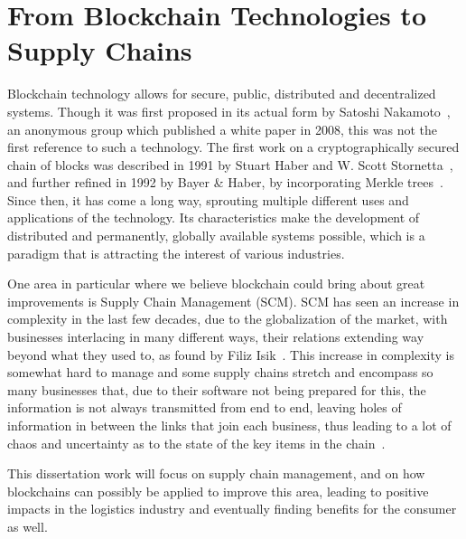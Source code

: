 \section{From Blockchain Technologies to Supply Chains} \label{sec:context}

Blockchain technology allows for secure, public, distributed and decentralized systems. Though it was first proposed in its actual form by Satoshi Nakamoto~\cite{Nakamoto2008}, an anonymous group which published a white paper in 2008, this was not the first reference to such a technology. The first work on a cryptographically secured chain of blocks was described in 1991 by Stuart Haber and W. Scott Stornetta~\cite{Haber1991}, and further refined in 1992 by Bayer \& Haber, by incorporating Merkle trees~\cite{Bayer1993}. Since then, it has come a long way, sprouting multiple different uses and applications of the technology. Its characteristics make the development of distributed and permanently, globally available systems possible, which is a paradigm that is attracting the interest of various industries.

One area in particular where we believe blockchain could bring about great improvements is Supply Chain Management (SCM). SCM has seen an increase in complexity in the last few decades, due to the globalization of the market, with businesses interlacing in many different ways, their relations extending way beyond what they used to, as found by Filiz Isik~\cite{Isik2011}. This increase in complexity is somewhat hard to manage and some supply chains stretch and encompass so many businesses that, due to their software not being prepared for this, the information is not always transmitted from end to end, leaving holes of information in between the links that join each business, thus leading to a lot of chaos and uncertainty as to the state of the key items in the chain~\cite{Wilding1998}.

   This dissertation work will focus on supply chain management, and on how blockchains can possibly be applied to improve this area, leading to positive impacts in the logistics industry and eventually finding benefits for the consumer as well. 









